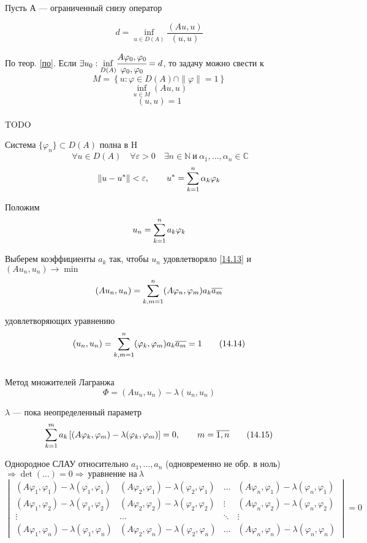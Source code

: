 Пусть А --- ограниченный снизу оператор

\[ d = \underset{u \in D(A)}{\inf} \frac{(Au, u)}{(u, u)} \label{14.11} \tag{14.11} \] 

По теор. \eqref{по}. Если $ \exists u_0 : \underset{D(A)}{\inf} \cfrac{A \varphi_0, \varphi_0}{\varphi_0, \varphi_0} = d$, то задачу можно свести к
\[ M = \left\{ u: \varphi \in D(A) \cap	 \|\varphi\|=1 \right\} \]
\[ \underset{u \in M}{\inf} (Au, u) \label{14.12} \tag{14.12} \]
\[ (u, u) = 1 \label{14.13} \tag{14.13} \] \\

TODO

Система $ \{ \varphi_n \} \subset D(A)$ полна в H
\[\ \forall u \in D(A) \quad \forall \varepsilon > 0 \quad \exists n \in \mathbb{N} \ \text{и} \ \alpha_1, ... , \alpha_n \in \mathbb{C} \]
\[ \|u - u^*\| < \varepsilon, \qquad u^* = \sum\limits_{k=1}^{n} \alpha_k \varphi_k \]

Положим
\[ u_n = \sum\limits_{k=1}^{n} a_k \varphi_k \]

Выберем коэффициенты $a_k$ так, чтобы $u_n$ удовлетворяло \eqref{14.13} и $ (Au_n, u_n) \rightarrow \min $
\[ (A u_n, u_n) = \sum\limits_{k,m = 1}^{n} (A \varphi_n, \varphi_m) a_k \overline{a_m} \]

удовлетворяющих уравнению
\[ (u_n, u_n) = \sum\limits_{k, m=1}^{n} (\varphi_k, \varphi_m) a_k \overline{a_m} = 1 \label{14.14} \tag{14.14} \] \\

Метод множителей Лагранжа
\[ \Phi = (A u_n, u_n) - \lambda (u_n, u_n) \]

$ \lambda  $ --- пока неопределенный параметр
\[ \sum\limits_{k=1}^{m} a_k \left[(A \varphi_k, \varphi_m) - \lambda (\varphi_k, \varphi_m)\right] = 0, \qquad m= \overline{1,n} \label{14.15} \tag{14.15} \]

Однородное СЛАУ относительно $ a_1, ... , a_n $ (одновременно не обр. в ноль) $ \Rightarrow \det (...) = 0 \Rightarrow \ \text{уравнение на} \ \lambda $
\[ \begin{vmatrix}
	(A\varphi_1, \varphi_1) - \lambda (\varphi_1, \varphi_1) & (A\varphi_2, \varphi_1) - \lambda (\varphi_2, \varphi_1) & \dots & (A\varphi_n, \varphi_1) - \lambda (\varphi_n, \varphi_1) \\
	(A\varphi_1, \varphi_2) - \lambda (\varphi_1, \varphi_2) & (A\varphi_2, \varphi_2) - \lambda (\varphi_2, \varphi_2) & \vdots & (A\varphi_n, \varphi_2) - \lambda (\varphi_n, \varphi_2) \\ 
	\vdots & \dots & \ddots & \vdots \\
	(A\varphi_1, \varphi_n) - \lambda (\varphi_1, \varphi_n) & (A\varphi_2, \varphi_n) - \lambda (\varphi_2, \varphi_n) & \dots & (A\varphi_n, \varphi_n) - \lambda (\varphi_n, \varphi_n)
\end{vmatrix}
= 0 \label{14.16} \tag{14.16} \]

